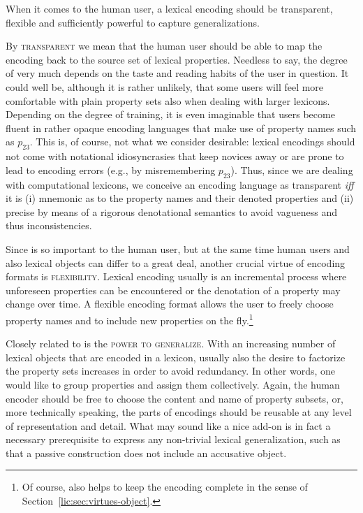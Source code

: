 \documentclass[output=paper]{langsci/langscibook}
\begin{document}
When it comes to the human user, a lexical encoding should be transparent, flexible and sufficiently powerful to capture generalizations.

By \textsc{transparent} we mean that the human user should be able to map the encoding back to the source set of lexical properties. Needless to say, the degree of  very much depends on the taste and reading habits of the user in question. It could well be, although it is rather unlikely, that some users will feel more comfortable with plain property sets also when dealing with larger lexicons. Depending on the degree of training, it is even imaginable that users become fluent in rather opaque encoding languages that make use of property names such as $p_{23}$. This is, of course, not what we consider desirable: lexical encodings should not come with notational idiosyncrasies that keep novices away or are prone to lead to encoding errors (e.g., by misremembering $p_{23}$). Thus, since we are dealing with computational lexicons, we conceive an encoding language as transparent \textit{iff} it is (i) mnemonic as to the property names and their denoted properties and (ii) precise by means of a rigorous denotational semantics to avoid vagueness and thus inconsistencies. 

Since  is so important to the human user, but at the same time human users and also lexical objects can differ to a great deal, another crucial virtue of encoding formats is \textsc{flexibility}. Lexical encoding usually is an incremental process where unforeseen properties can be encountered or the denotation of a property may change over time. A flexible encoding format allows the user to freely choose property names and to include new properties on the fly.\footnote{Of course,  also helps to keep the encoding complete in the sense of Section~\ref{lic:sec:virtues-object}.} 

Closely related to  is the \textsc{power to generalize}. With an increasing number of lexical objects that are encoded in a lexicon, usually also the desire to factorize the property sets increases in order to avoid redundancy. In other words, one would like to group properties and assign them collectively. Again, the human encoder should be free to choose the content and name of property subsets, or, more technically speaking, the parts of encodings should be reusable at any level of representation and detail. What may sound like a nice add-on is in fact a necessary prerequisite to express any non-trivial lexical generalization, such as that a passive construction does not include an accusative object.
\end{document}
